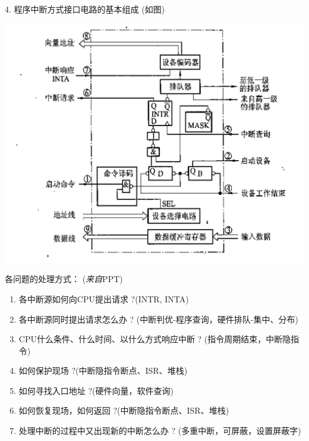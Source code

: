 \documentclass[]{report}
\begin{document}
				4. 程序中断方式接口电路的基本组成 (如图)\par
					\includegraphics[scale = 0.2]{../pictures/Program_Interrupt_Interface.png}\par
				各问题的处理方式：
				({\ttfamily\textit {来自}}{\sffamily PPT})\par
				\begin{enumerate}[label={\sffamily(\alph{*})}]
					\item 各中断源如何向CPU提出请求 ?(INTR, INTA)
					\item 各中断源同时提出请求怎么办 ? (中断判优-程序查询，硬件排队-集中、分布)
					\item CPU什么条件、什么时间、以什么方式响应中断 ? (指令周期结束，中断隐指令)
					\item 如何保护现场 ?(中断隐指令断点、ISR、堆栈)
					\item 如何寻找入口地址 ?(硬件向量，软件查询)
					\item 如何恢复现场，如何返回 ?(中断隐指令断点、ISR、堆栈)
					\item 处理中断的过程中又出现新的中断怎么办 ? (多重中断，可屏蔽，设置屏蔽字)
				\end{enumerate}
\end{document}
